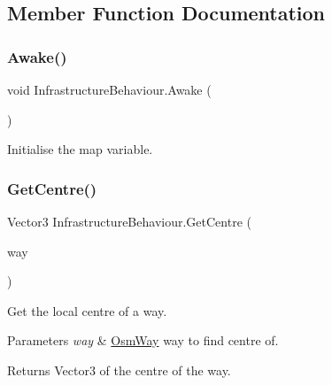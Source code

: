 \subsection{Member Function Documentation}
\mbox{\label{class_infrastructure_behaviour_a891b2aa802037993c1ad9d49cb6089cd}} 
\subsubsection{\texorpdfstring{Awake()}{Awake()}}
{\footnotesize\ttfamily void Infrastructure\+Behaviour.\+Awake (\begin{DoxyParamCaption}{ }\end{DoxyParamCaption})\hspace{0.3cm}{\ttfamily [private]}}



Initialise the map variable. 

\mbox{\label{class_infrastructure_behaviour_af9591282d45cf5a400099db0d8317ce6}} 
\subsubsection{\texorpdfstring{GetCentre()}{GetCentre()}}
{\footnotesize\ttfamily Vector3 Infrastructure\+Behaviour.\+Get\+Centre (\begin{DoxyParamCaption}\item[{\mbox{\hyperlink{class_osm_way}{Osm\+Way}}}]{way }\end{DoxyParamCaption})\hspace{0.3cm}{\ttfamily [protected]}}



Get the local centre of a way. 


\begin{DoxyParams}{Parameters}
{\em way} & \mbox{\hyperlink{class_osm_way}{Osm\+Way}} way to find centre of.\\
\hline
\end{DoxyParams}
\begin{DoxyReturn}{Returns}
Vector3 of the centre of the way.
\end{DoxyReturn}


